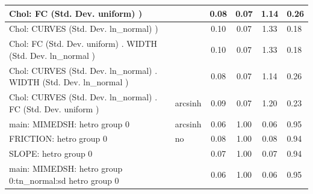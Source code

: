 \begin{table}
\begin{center}
\begin{tabular}{|l|l|c|c|c|l|}
			\hline
			 Chol: FC (Std. Dev. uniform) ) &  & 0.08 & 0.07 & 1.14 & 0.26 \\
			\hline
			 Chol: CURVES (Std. Dev. ln_normal) ) &  & 0.10 & 0.07 & 1.33 & 0.18 \\
			\hline
			 Chol: FC (Std. Dev. uniform) . WIDTH (Std. Dev.   ln_normal ) &  & 0.10 & 0.07 & 1.33 & 0.18 \\
			\hline
			 Chol: CURVES (Std. Dev. ln_normal) . WIDTH (Std. Dev.   ln_normal ) &  & 0.08 & 0.07 & 1.14 & 0.26 \\
			\hline
			 Chol: CURVES (Std. Dev. ln_normal) . FC (Std. Dev.   uniform ) & arcsinh & 0.09 & 0.07 & 1.20 & 0.23 \\
			\hline
			main: MIMEDSH: hetro group 0 & arcsinh & 0.06 & 1.00 & 0.06 & 0.95 \\
			\hline
			FRICTION: hetro group 0 & no & 0.08 & 1.00 & 0.08 & 0.94 \\
			\hline
			SLOPE: hetro group 0 &  & 0.07 & 1.00 & 0.07 & 0.94 \\
			\hline
			main: MIMEDSH: hetro group 0:tn_normal:sd  hetro group 0 &  & 0.06 & 1.00 & 0.06 & 0.95 \\
			\hline
		\end{tabular}
	\end{center}
\end{table}
